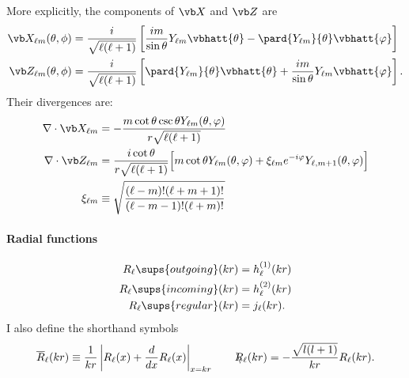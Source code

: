 \documentclass[letterpaper]{article}
\newcommand{\lm}{_{\ell m}}
\newcommand{\RBar}{\overline{R}}
\newcommand{\RSlash}{\backslash\hspace{-0.08in}R}
\begin{document}
\noindent More explicitly, the components of $\vb X$ and $\vb Z$ are
\begin{align*}
\vb X\lm(\theta, \phi) 
&= 
   \frac{i}{\sqrt{\ell(\ell+1)}}
   \left[  \frac{im}{\sin\theta}Y_{\ell m} \vbhatt{\theta}
           -\pard{Y_{\ell m}}{\theta}\vbhatt{\varphi}
   \right]
\\
\vb Z\lm(\theta, \phi) 
&=
   \frac{i}{\sqrt{\ell(\ell+1)}}
   \left[   \pard{Y_{\ell m}}{\theta}\vbhatt{\theta}
           +\frac{im}{\sin\theta}Y_{\ell m} \vbhatt{\varphi}
   \right].
\end{align*}
Their divergences are:
\begin{subequations}
\begin{align}
\nabla \cdot \vb X\lm
 &=-\frac{m\cot\theta\csc\theta Y\lm(\theta,\varphi)}
         {r\sqrt{\ell(\ell+1)}}
\\
\nabla \cdot \vb Z\lm
 &= \frac{i\cot\theta}{r \sqrt{\ell(\ell+1)}}
    \Big[ m\cot\theta Y\lm(\theta, \varphi)
          + \xi\lm e^{-i\varphi}Y_{\ell,m+1}(\theta,\varphi)
    \Big]
\\
\xi\lm&\equiv\sqrt\frac{ (\ell-m)! (\ell+m+1)!}{(\ell-m-1)!(\ell+m)!}
\end{align}
\label{XZDivergences}
\end{subequations}

\paragraph{Radial functions}
\begin{align*}
 R_\ell \sups{outgoing}(kr)  &= h^{(1)}_\ell(kr) \\
 R_\ell \sups{incoming}(kr)  &= h^{(2)}_\ell(kr) \\
 R_\ell \sups{regular}(kr)   &= j_\ell(kr).
\end{align*}
I also define the shorthand symbols
$$ \RBar_\ell(kr)
   \equiv 
   \frac{1}{kr}\left|R_\ell(x) + \frac{d}{dx}R_\ell(x)\right|_{x=kr}
   \qquad
   \RSlash_\ell(kr) = -\frac{\sqrt{l(l+1)}}{kr} R_\ell(kr).
$$
\end{document}
